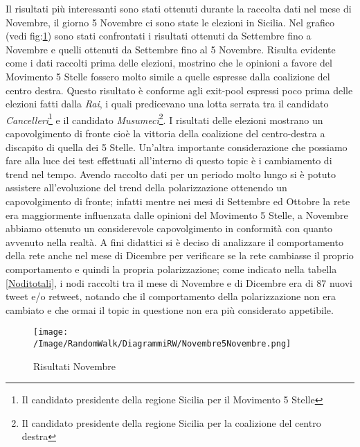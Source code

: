 Il risultati più interessanti sono stati ottenuti durante la raccolta dati nel mese di Novembre, il giorno 5 Novembre ci sono state le elezioni in Sicilia. Nel grafico (vedi fig:\ref{NovembrevsNovembre}) sono stati confrontati i risultati ottenuti da Settembre fino a Novembre e quelli ottenuti da Settembre fino al 5 Novembre. Risulta evidente come i dati raccolti prima delle elezioni, mostrino che le opinioni a favore del Movimento 5 Stelle fossero molto simile a quelle espresse dalla coalizione del centro destra. Questo risultato è conforme agli exit-pool espressi poco prima delle elezioni fatti dalla \textit{Rai}, i quali predicevano una lotta serrata tra il candidato \textit{Cancelleri}\footnote{Il candidato presidente della regione Sicilia per il Movimento 5 Stelle} e il candidato \textit{Musumeci}\footnote{Il candidato presidente della regione Sicilia per la coalizione del centro destra}.
I risultati delle elezioni mostrano un capovolgimento di fronte cioè la vittoria della coalizione del centro-destra a discapito di quella dei 5 Stelle. Un'altra importante considerazione che possiamo fare alla luce dei test effettuati all'interno di questo topic è i cambiamento di trend nel tempo. Avendo raccolto dati per un periodo molto lungo si è potuto assistere all'evoluzione del trend della polarizzazione ottenendo un capovolgimento di fronte; infatti mentre nei mesi di Settembre ed Ottobre la rete era maggiormente influenzata dalle opinioni del Movimento 5 Stelle, a Novembre abbiamo ottenuto un considerevole capovolgimento in conformità con quanto avvenuto nella realtà.
A fini didattici si è deciso di analizzare il comportamento della rete anche nel mese di Dicembre per verificare se la rete cambiasse il proprio comportamento e quindi la propria polarizzazione; come indicato nella tabella \ref{Noditotali}, i nodi raccolti tra il mese di Novembre e di Dicembre era di 87 nuovi tweet e/o retweet, notando che il comportamento della polarizzazione non era cambiato e che ormai il topic in questione non era più considerato appetibile.
\begin{figure}[!ht]
\centering
\texttt{[image: /Image/RandomWalk/DiagrammiRW/Novembre5Novembre.png]}
\caption{Risultati Novembre}
\label{NovembrevsNovembre}
\end{figure}

